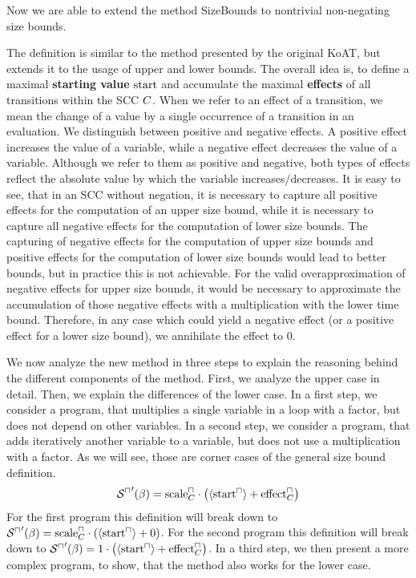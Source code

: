 Now we are able to extend the method SizeBounds to nontrivial non-negating size bounds.



The definition is similar to the method presented by the original KoAT, but extends it to the usage of upper and lower bounds.
The overall idea is, to define a maximal \textbf{starting value} $\text{start}$ and accumulate the maximal \textbf{effects} of all transitions within the SCC $C$.
When we refer to an effect of a transition, we mean the change of a value by a single occurrence of a transition in an evaluation.
We distinguish between positive and negative effects.
A positive effect increases the value of a variable, while a negative effect decreases the value of a variable.
Although we refer to them as positive and negative, both types of effects reflect the absolute value by which the variable increases/decreases.
It is easy to see, that in an SCC without negation, it is necessary to capture all positive effects for the computation of an upper size bound, while it is necessary to capture all negative effects for the computation of lower size bounds.
The capturing of negative effects for the computation of upper size bounds and positive effects for the computation of lower size bounds would lead to better bounds, but in practice this is not achievable.
For the valid overapproximation of negative effects for upper size bounds, it would be necessary to approximate the accumulation of those negative effects with a multiplication with the lower time bound.
Therefore, in any case which could yield a negative effect (or a positive effect for a lower size bound), we annihilate the effect to $0$.

We now analyze the new method in three steps to explain the reasoning behind the different components of the method.
First, we analyze the upper case in detail.
Then, we explain the differences of the lower case.
In a first step, we consider a program, that multiplies a single variable in a loop with a factor, but does not depend on other variables.
In a second step, we consider a program, that adds iteratively another variable to a variable, but does not use a multiplication with a factor.
As we will see, those are corner cases of the general size bound definition.
\[ {\mathcal{S}^\sqcap}'(\beta) = \text{scale}^\sqcap_C \cdot \left( \langle\text{start}^\sqcap\rangle + \text{effect}^\sqcap_C \right) \]
For the first program this definition will break down to ${\mathcal{S}^\sqcap}'(\beta) = \text{scale}^\sqcap_C \cdot \left( \langle\text{start}^\sqcap\rangle + 0 \right)$.
For the second program this definition will break down to ${\mathcal{S}^\sqcap}'(\beta) = 1 \cdot \left( \langle\text{start}^\sqcap\rangle + \text{effect}^\sqcap_C \right)$.
In a third step, we then present a more complex program, to show, that the method also works for the lower case.

